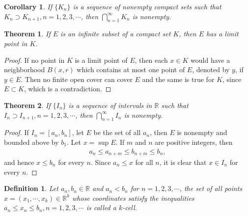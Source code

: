 \documentclass[11pt]{book}
\newtheorem{definition}{Definition}[chapter]
\newtheorem{theorem}{Theorem}[chapter]
\newtheorem{corollary}{Corollary}[theorem]
\theoremstyle{definition}
\numberwithin{equation}{chapter}
\begin{document}
\medskip

\begin{corollary}\label{coro_118_1}
If $\{K_n\}$ is a sequence of nonempty compact sets such that $K_n \supset K_{n+1}, n = 1,2,3,\cdots$, then $\bigcap^\infty_{n=1} K_n$ is nonempty.
\end{corollary}

\medskip

\begin{theorem}\label{th_119}
If $E$ is an infinite subset of a compact set $K$, then $E$ has a limit point in $K$.
\end{theorem}
\begin{proof}
If no point in $K$ is a limit point of $E$, then each $x \in K$ would have a neighborhood $B(x,r)$ which contains at most one point of $E$, denoted by $y$, if $y \in E$. Then no finite open cover can cover $E$ and the same is true for $K$, since $E \subset K$, which is a contradiction.
\end{proof}

\medskip

\begin{theorem}\label{th_120}
If $\{I_n\}$ is a sequence of intervals in $\mathbb{R}$ such that $I_n \supset I_{n+1}, n = 1,2,3,\cdots$, then $\bigcap^\infty_{n=1} I_n$ is nonempty.
\end{theorem}
\begin{proof}
If $I_n = [a_n, b_n]$, let $E$ be the set of all $a_n$, then $E$ is nonempty and bounded above by $b_1$. Let $x = \sup E$. If $m$ and $n$ are positive integers, then 
\begin{align*}
    a_n \leq a_{n+m} \leq b_{n+m} \leq b_n,
\end{align*}
and hence $x \leq b_n$ for every $n$. Since $a_n \leq x$ for all $n$, it is clear that $x \in I_n$ for every $n$.
\end{proof}

\medskip

\begin{definition}
Let $a_n, b_n \in \mathbb{R}$ and $a_n < b_n$ for $n = 1,2,3,\cdots$, the set of all points $x = (x_1, \cdots, x_k) \in \mathbb{R}^k$ whose coordinates satisfy the inequalities $a_n \leq x_n \leq b_n, n = 1,2,3,\cdots$ is called a $k$-cell.
\end{definition}

\medskip
\end{document}
